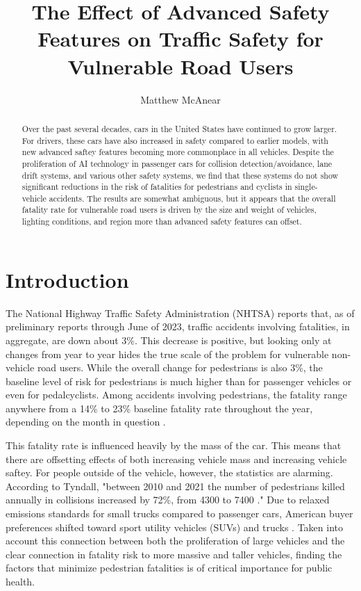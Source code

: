 \documentclass[12pt]{article}
\author{Matthew McAnear}
\title{The Effect of Advanced Safety Features on Traffic Safety for Vulnerable Road Users}
\begin{document}
\maketitle

\begin{abstract}
    Over the past several decades, cars in the United States have continued to grow larger. For drivers, these cars
    have also increased in safety compared to earlier models, with new advanced saftey features becoming more
    commonplace in all vehicles. Despite the proliferation of AI technology in passenger cars for collision
    detection/avoidance, lane drift systems, and various other safety systems, we find that these systems do not
    show significant reductions in the risk of fatalities for pedestrians and cyclists in single-vehicle accidents. The
    results are somewhat ambiguous, but it appears that the overall fatality rate for vulnerable road users is driven
    by the size and weight of vehicles, lighting conditions, and region more than advanced safety features can offset.
\end{abstract}


\section{Introduction}

The National Highway Traffic Safety Administration (NHTSA) reports that, as of preliminary reports through
June of 2023, traffic accidents involving fatalities, in aggregate, are down about 3\%. This decrease is positive,
but looking only at changes from year to year hides the true scale of the problem for vulnerable non-vehicle
road users. While the overall change for pedestrians is also 3\%, the baseline level of risk for pedestrians is
much higher than for passenger vehicles or even for pedalcyclists. Among accidents involving pedestrians, the fatality
range anywhere from a 14\% to 23\% baseline fatality rate throughout the year, depending on the month in
question \cite{national_highway_traffic_safety_administration_early_2024}.

This fatality rate is influenced heavily by the mass of the car\cite{evans_car_1992}. This means that there
are offsetting effects of both increasing vehicle mass and increasing
vehicle saftey. For people outside of the vehicle, however, the statistics are alarming. According to Tyndall,
"between 2010 and 2021 the number of pedestrians killed annually in collisions increased by 72\%, from 4300 to
7400 \cite{tyndall_effect_2024}." Due to relaxed emissions standards for small trucks compared to passenger cars,
American buyer preferences shifted toward sport utility vehicles (SUVs) and trucks \cite{kovach_rise_2021}. Taken into
account this connection between both the proliferation of large vehicles and the clear connection in fatality risk to
more massive and taller vehicles\cite{tyndall_effect_2024}, finding the factors that minimize pedestrian fatalities
is of critical importance for public health.
\end{document}
